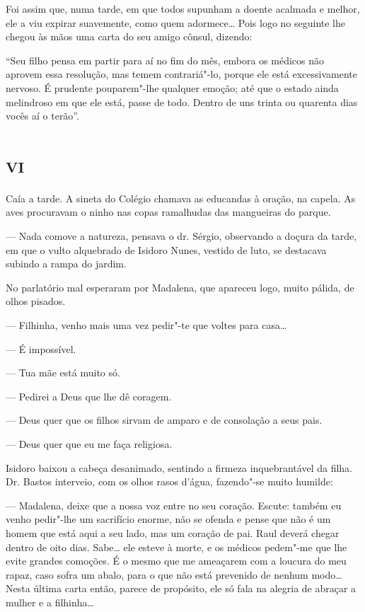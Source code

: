Foi assim que, numa tarde, em que todos supunham a doente acalmada e
melhor, ele a viu expirar suavemente, como quem adormece\ldots{} Pois logo no
seguinte lhe chegou às mãos uma carta do seu amigo cônsul, dizendo:

``Seu filho pensa em partir para aí no fim do mês, embora os médicos não
aprovem essa resolução, mas temem contrariá"-lo, porque ele está
excessivamente nervoso. É prudente pouparem"-lhe qualquer emoção; até que
o estado ainda melindroso em que ele está, passe de todo. Dentro de uns
trinta ou quarenta dias vocês aí o terão''.

\section*{\textsc{vi}}

Caía a tarde. A sineta do Colégio chamava as educandas à oração, na
capela. As aves procuravam o ninho nas copas ramalhudas das mangueiras
do parque.

--- Nada comove a natureza, pensava o dr. Sérgio, observando a doçura da
tarde, em que o vulto alquebrado de Isidoro Nunes, vestido de luto, se
destacava subindo a rampa do jardim.

No parlatório mal esperaram por Madalena, que apareceu logo, muito
pálida, de olhos pisados.

--- Filhinha, venho mais uma vez pedir"-te que voltes para casa\ldots{}

--- É impossível.

--- Tua mãe está muito só.

--- Pedirei a Deus que lhe dê coragem.

--- Deus quer que os filhos sirvam de amparo e de consolação a seus
pais.

--- Deus quer que eu me faça religiosa.

Isidoro baixou a cabeça desanimado, sentindo a firmeza inquebrantável da
filha. Dr. Bastos interveio, com os olhos rasos d'água, fazendo"-se muito
humilde:

--- Madalena, deixe que a nossa voz entre no seu coração. Escute: também
eu venho pedir"-lhe um sacrifício enorme, não se ofenda e pense que não é
um homem que está aqui a seu lado, mas um coração de pai. Raul deverá
chegar dentro de oito dias. Sabe\ldots{} ele esteve à morte, e os médicos
pedem"-me que lhe evite grandes comoções. É o mesmo que me ameaçarem com
a loucura do meu rapaz, caso sofra um abalo, para o que não está
prevenido de nenhum modo\ldots{} Nesta última carta então, parece de
propósito, ele só fala na alegria de abraçar a mulher e a filhinha\ldots{}

